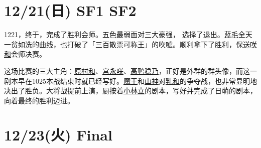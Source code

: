 \section{12/21(日) SF1 SF2}



1221，终于，完成了胜利会师。五色最弱面对三大豪强， 选择了退出。\uline{蓝毛}全天一贫如洗的曲线，也打破了「三百散票可称王」的吹嘘。顺利拿下了胜利，保送\uline{咲}\uline{和}会师决赛。

这场比赛的三大主角：\uline{原村和}、\uline{宫永咲}、\uline{高鸭稳乃}，正好是外群的群头像，而这一剧本早在1025本战结束时就已经写好。\uline{魔王}和\uline{山神}对\uline{乳和}的争夺战，也非常显明地决出了胜负。大将战提前上演，厨按着\uline{小林立}的剧本，写好并完成了日萌的剧本，向着最终的胜利迈进。

\section{12/23(火) Final}



